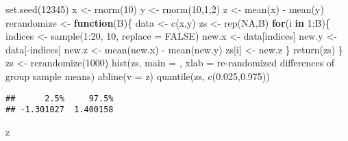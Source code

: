 \documentclass[
]{book}
\newenvironment{Shaded}{\begin{snugshade}}{\end{snugshade}}
\newcommand{\AttributeTok}[1]{\textcolor[rgb]{0.77,0.63,0.00}{#1}}
\newcommand{\ConstantTok}[1]{\textcolor[rgb]{0.00,0.00,0.00}{#1}}
\newcommand{\ControlFlowTok}[1]{\textcolor[rgb]{0.13,0.29,0.53}{\textbf{#1}}}
\newcommand{\DecValTok}[1]{\textcolor[rgb]{0.00,0.00,0.81}{#1}}
\newcommand{\FloatTok}[1]{\textcolor[rgb]{0.00,0.00,0.81}{#1}}
\newcommand{\FunctionTok}[1]{\textcolor[rgb]{0.00,0.00,0.00}{#1}}
\newcommand{\NormalTok}[1]{#1}
\newcommand{\OtherTok}[1]{\textcolor[rgb]{0.56,0.35,0.01}{#1}}
\newcommand{\SpecialCharTok}[1]{\textcolor[rgb]{0.00,0.00,0.00}{#1}}
\newcommand{\StringTok}[1]{\textcolor[rgb]{0.31,0.60,0.02}{#1}}
\theoremstyle{definition}
\theoremstyle{definition}
\theoremstyle{definition}
\theoremstyle{definition}
\theoremstyle{remark}
\begin{document}
\begin{Shaded}
\begin{Highlighting}[]
\FunctionTok{set.seed}\NormalTok{(}\DecValTok{12345}\NormalTok{)}
\NormalTok{x }\OtherTok{\textless{}{-}} \FunctionTok{rnorm}\NormalTok{(}\DecValTok{10}\NormalTok{)}
\NormalTok{y }\OtherTok{\textless{}{-}} \FunctionTok{rnorm}\NormalTok{(}\DecValTok{10}\NormalTok{,}\DecValTok{1}\NormalTok{,}\DecValTok{2}\NormalTok{)}
\NormalTok{z }\OtherTok{\textless{}{-}} \FunctionTok{mean}\NormalTok{(x) }\SpecialCharTok{{-}} \FunctionTok{mean}\NormalTok{(y)}
\NormalTok{rerandomize }\OtherTok{\textless{}{-}} \ControlFlowTok{function}\NormalTok{(B)\{}
\NormalTok{  data }\OtherTok{\textless{}{-}} \FunctionTok{c}\NormalTok{(x,y)}
\NormalTok{  zs }\OtherTok{\textless{}{-}} \FunctionTok{rep}\NormalTok{(}\ConstantTok{NA}\NormalTok{,B)}
  \ControlFlowTok{for}\NormalTok{(i }\ControlFlowTok{in} \DecValTok{1}\SpecialCharTok{:}\NormalTok{B)\{}
\NormalTok{    indices }\OtherTok{\textless{}{-}} \FunctionTok{sample}\NormalTok{(}\DecValTok{1}\SpecialCharTok{:}\DecValTok{20}\NormalTok{, }\DecValTok{10}\NormalTok{, }\AttributeTok{replace =} \ConstantTok{FALSE}\NormalTok{)}
\NormalTok{    new.x }\OtherTok{\textless{}{-}}\NormalTok{ data[indices]}
\NormalTok{    new.y }\OtherTok{\textless{}{-}}\NormalTok{ data[}\SpecialCharTok{{-}}\NormalTok{indices]}
\NormalTok{    new.z }\OtherTok{\textless{}{-}} \FunctionTok{mean}\NormalTok{(new.x) }\SpecialCharTok{{-}} \FunctionTok{mean}\NormalTok{(new.y)}
\NormalTok{    zs[i] }\OtherTok{\textless{}{-}}\NormalTok{ new.z}
\NormalTok{  \}}
\FunctionTok{return}\NormalTok{(zs)}
\NormalTok{\}}
\NormalTok{zs }\OtherTok{\textless{}{-}} \FunctionTok{rerandomize}\NormalTok{(}\DecValTok{1000}\NormalTok{)}
\FunctionTok{hist}\NormalTok{(zs, }\AttributeTok{main =} \StringTok{\textquotesingle{}\textquotesingle{}}\NormalTok{, }\AttributeTok{xlab =} \StringTok{\textquotesingle{}re{-}randomized differences of group sample means\textquotesingle{}}\NormalTok{)}
\FunctionTok{abline}\NormalTok{(}\AttributeTok{v =}\NormalTok{ z)}
\FunctionTok{quantile}\NormalTok{(zs, }\FunctionTok{c}\NormalTok{(}\FloatTok{0.025}\NormalTok{,}\FloatTok{0.975}\NormalTok{))  }
\end{Highlighting}
\end{Shaded}

\begin{verbatim}
##      2.5%     97.5% 
## -1.301027  1.400158
\end{verbatim}

\begin{Shaded}
\begin{Highlighting}[]
\NormalTok{z  }
\end{Highlighting}
\end{Shaded}
\end{document}
